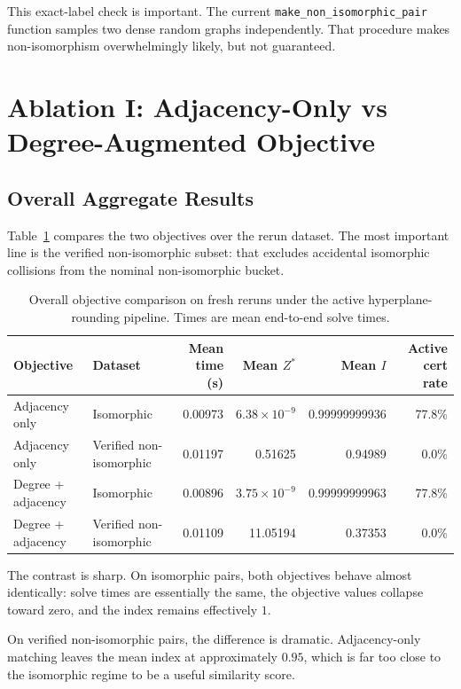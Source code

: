 \documentclass[11pt]{article}
\begin{document}
This exact-label check is important.
The current \texttt{make\_non\_isomorphic\_pair} function samples two dense random graphs independently.
That procedure makes non-isomorphism overwhelmingly likely, but not guaranteed.

\section{Ablation I: Adjacency-Only vs Degree-Augmented Objective}

\subsection{Overall Aggregate Results}

Table~\ref{tab:overall-objective} compares the two objectives over the rerun dataset.
The most important line is the verified non-isomorphic subset:
that excludes accidental isomorphic collisions from the nominal non-isomorphic bucket.

\begin{table}[h]
\centering
\caption{Overall objective comparison on fresh reruns under the active hyperplane-rounding pipeline. Times are mean end-to-end solve times.}
\label{tab:overall-objective}
\begin{tabular}{>{\raggedright\arraybackslash}p{4.0cm} >{\raggedright\arraybackslash}p{3.0cm} r r r r}
\toprule
Objective & Dataset & Mean time (s) & Mean $Z^*$ & Mean $I$ & Active cert rate \\
\midrule
Adjacency only & Isomorphic & 0.00973 & $6.38 \times 10^{-9}$ & 0.99999999936 & 77.8\% \\
Adjacency only & Verified non-isomorphic & 0.01197 & 0.51625 & 0.94989 & 0.0\% \\
\addlinespace
Degree + adjacency & Isomorphic & 0.00896 & $3.75 \times 10^{-9}$ & 0.99999999963 & 77.8\% \\
Degree + adjacency & Verified non-isomorphic & 0.01109 & 11.05194 & 0.37353 & 0.0\% \\
\bottomrule
\end{tabular}
\end{table}

The contrast is sharp.
On isomorphic pairs, both objectives behave almost identically:
solve times are essentially the same,
the objective values collapse toward zero,
and the index remains effectively $1$.

On verified non-isomorphic pairs, the difference is dramatic.
Adjacency-only matching leaves the mean index at approximately $0.95$,
which is far too close to the isomorphic regime to be a useful similarity score.
\end{document}
